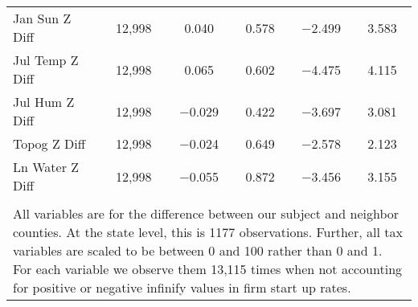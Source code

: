 \begin{table}[!htbp]
\begin{tabular}{@{\extracolsep{5pt}}lccccc}
Jan Sun Z Diff & 12,998 & 0.040 & 0.578 & $-$2.499 & 3.583 \\ 
Jul Temp Z Diff & 12,998 & 0.065 & 0.602 & $-$4.475 & 4.115 \\ 
Jul Hum Z Diff & 12,998 & $-$0.029 & 0.422 & $-$3.697 & 3.081 \\ 
Topog Z Diff & 12,998 & $-$0.024 & 0.649 & $-$2.578 & 2.123 \\ 
Ln Water Z Diff & 12,998 & $-$0.055 & 0.872 & $-$3.456 & 3.155 \\ 
\hline \\[-1.8ex] 
\multicolumn{6}{l}{All variables are for the difference between our subject and neighbor counties. At the state level, this is 1177 observations. Further, all tax variables are scaled to be between 0 and 100 rather than 0 and 1. For each variable we observe them 13,115 times when not accounting for positive or negative infinify values in firm start up rates.} \\ 
\end{tabular} 
\end{table} 

